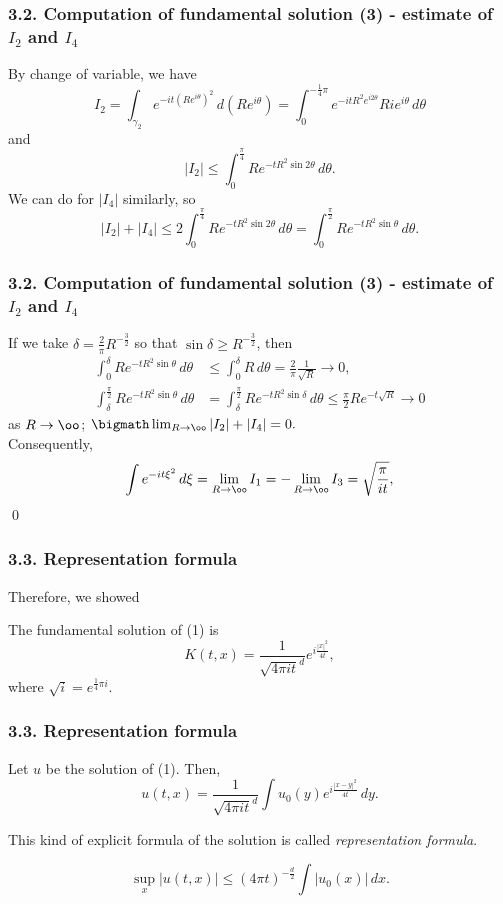 \documentclass[8pt]{beamer}
\begin{document}
\begin{frame}
\frametitle{3.2. Computation of fundamental solution (3) - estimate of $I_2$ and $I_4$}
By change of variable, we have
\[I_2=\int_{\gamma_2}e^{-it(Re^{i\theta})^2}\,d(Re^{i\theta})=\int_0^{-\frac14\pi}e^{-itR^2e^{i2\theta}}Rie^{i\theta}\,d\theta\]
and
\[|I_2|\le\int_0^{\frac\pi4}Re^{-tR^2\sin2\theta}\,d\theta.\]
We can do for $|I_4|$ similarly, so
\[|I_2|+|I_4|\le2\int_0^{\frac\pi4}Re^{-tR^2\sin2\theta}\,d\theta=\int_0^{\frac\pi2}Re^{-tR^2\sin\theta}\,d\theta.\]
\end{frame}

\begin{frame}
\frametitle{3.2. Computation of fundamental solution (3) - estimate of $I_2$ and $I_4$}
If we take $\delta=\frac2\pi R^{-\frac32}$ so that $\sin\delta\ge R^{-\frac32}$, then
\begin{align*}
\int_0^\delta Re^{-tR^2\sin\theta}\,d\theta&\le\int_0^\delta R\,d\theta=\frac2\pi\frac1{\sqrt{R}}\to0,\\
\int_\delta^{\frac\pi2}Re^{-tR^2\sin\theta}\,d\theta&=\int_\delta^{\frac\pi2}Re^{-tR^2\sin\delta}\,d\theta\le\frac\pi2Re^{-t\sqrt{R}}\to0
\end{align*}
as $R\to\oo$; $\bigmath\lim_{R\to\oo}|I_2|+|I_4|=0.$\\[1em]
Consequently,
\[\int e^{-it\xi^2}\,d\xi=\lim_{R\to\oo}I_1=-\lim_{R\to\oo}I_3=\sqrt{\frac\pi{it}},\]
\qed
\end{frame}

\begin{frame}
\frametitle{3.3. Representation formula}
Therefore, we showed
\begin{thm}
The fundamental solution of (1) is
\[K(t,x)=\frac1{\sqrt{4\pi it}^d}e^{i\frac{|x|^2}{4t}},\]
where $\sqrt{i}=e^{\frac14\pi i}$.
\end{thm}
\end{frame}

\begin{frame}
\frametitle{3.3. Representation formula}
\begin{thm}
Let $u$ be the solution of (1).
Then,
\[u(t,x)=\frac1{\sqrt{4\pi it}^d}\int u_0(y)e^{i\frac{|x-y|^2}{4t}}\,dy.\]
\end{thm}
This kind of explicit formula of the solution is called \emph{representation formula}.
${}$
\begin{cor}
\[\sup_x|u(t,x)|\le(4\pi t)^{-\frac d2}\int|u_0(x)|\,dx.\]
\end{cor}

\end{frame}
\end{document}

